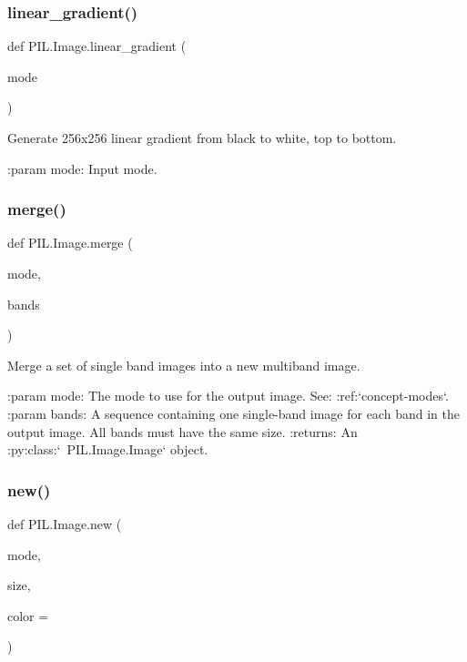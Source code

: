 \subsubsection{\texorpdfstring{linear\+\_\+gradient()}{linear\_gradient()}}
{\footnotesize\ttfamily def P\+I\+L.\+Image.\+linear\+\_\+gradient (\begin{DoxyParamCaption}\item[{}]{mode }\end{DoxyParamCaption})}

\begin{DoxyVerb}Generate 256x256 linear gradient from black to white, top to bottom.

:param mode: Input mode.
\end{DoxyVerb}
 \mbox{\label{namespacePIL_1_1Image_abc09f314a053ff8f709b5ed2aba502e3}} 
\subsubsection{\texorpdfstring{merge()}{merge()}}
{\footnotesize\ttfamily def P\+I\+L.\+Image.\+merge (\begin{DoxyParamCaption}\item[{}]{mode,  }\item[{}]{bands }\end{DoxyParamCaption})}

\begin{DoxyVerb}Merge a set of single band images into a new multiband image.

:param mode: The mode to use for the output image. See:
    :ref:`concept-modes`.
:param bands: A sequence containing one single-band image for
    each band in the output image.  All bands must have the
    same size.
:returns: An :py:class:`~PIL.Image.Image` object.
\end{DoxyVerb}
 \mbox{\label{namespacePIL_1_1Image_a678b32ccbe852b5442261810ec9064e9}} 
\subsubsection{\texorpdfstring{new()}{new()}}
{\footnotesize\ttfamily def P\+I\+L.\+Image.\+new (\begin{DoxyParamCaption}\item[{}]{mode,  }\item[{}]{size,  }\item[{}]{color = {} }\end{DoxyParamCaption})}

